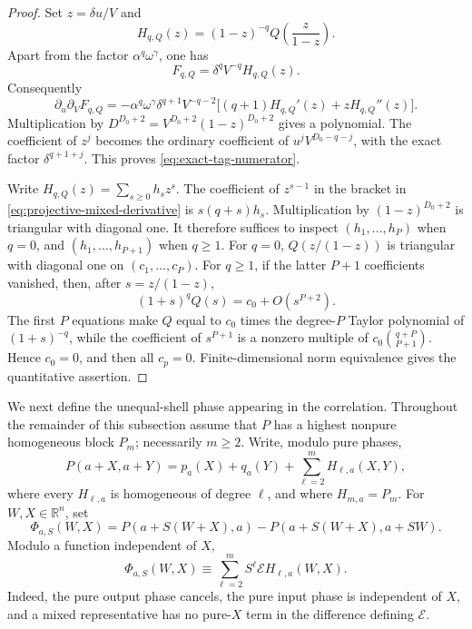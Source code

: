 \documentclass[11pt]{article}
\numberwithin{equation}{section}
\theoremstyle{remark}
\theoremstyle{definition}
\begin{document}
\begin{proof}
Set \(z=\delta u/V\) and
\[
 H_{q,Q}(z)=(1-z)^{-q}Q\left(\frac{z}{1-z}\right).
\]
Apart from the factor \(\alpha^q\omega^\gamma\), one has
\[
 F_{q,Q}=\delta^qV^{-q}H_{q,Q}(z).
\]
Consequently
\begin{equation}\label{eq:projective-mixed-derivative}
 \partial_u\partial_VF_{q,Q}
 =-\alpha^q\omega^\gamma\delta^{q+1}V^{-q-2}
 \bigl[(q+1)H_{q,Q}'(z)+zH_{q,Q}''(z)\bigr].
\end{equation}
Multiplication by
\(D^{D_0+2}=V^{D_0+2}(1-z)^{D_0+2}\) gives a polynomial.
The coefficient of \(z^j\) becomes the ordinary coefficient of
\(u^jV^{D_0-q-j}\), with the exact factor
\(\delta^{q+1+j}\).  This proves \eqref{eq:exact-tag-numerator}.

Write \(H_{q,Q}(z)=\sum_{s\ge0}h_sz^s\).  The coefficient of
\(z^{s-1}\) in the bracket in
\eqref{eq:projective-mixed-derivative} is
\(s(q+s)h_s\).  Multiplication by \((1-z)^{D_0+2}\) is triangular with
diagonal one.  It therefore suffices to inspect
\((h_1,\ldots,h_P)\) when \(q=0\), and
\((h_1,\ldots,h_{P+1})\) when \(q\ge1\).  For \(q=0\),
\(Q(z/(1-z))\) is triangular with diagonal one on
\((c_1,\ldots,c_P)\).  For \(q\ge1\), if the latter \(P+1\)
coefficients vanished, then, after \(s=z/(1-z)\),
\[
 (1+s)^qQ(s)=c_0+O(s^{P+2}).
\]
The first \(P\) equations make \(Q\) equal to \(c_0\) times the
degree-\(P\) Taylor polynomial of \((1+s)^{-q}\), while the coefficient
of \(s^{P+1}\) is a nonzero multiple of
\(c_0\binom{q+P}{P+1}\).  Hence \(c_0=0\), and then all \(c_p=0\).
Finite-dimensional norm equivalence gives the quantitative assertion.
\end{proof}

We next define the unequal-shell phase appearing in the correlation.
Throughout the remainder of this subsection assume that \(P\) has a
highest nonpure homogeneous block \(P_m\); necessarily \(m\ge2\).
Write, modulo pure phases,
\begin{equation}\label{eq:translated-homogeneous-blocks}
 P(a+X,a+Y)=p_a(X)+q_a(Y)+\sum_{\ell=2}^mH_{\ell,a}(X,Y),
\end{equation}
where every \(H_{\ell,a}\) is homogeneous of degree \(\ell\), and where
\(H_{m,a}=P_m\).  For \(W,X\in\mathbb R^n\), set
\begin{equation}\label{eq:actual-correlation-phase}
 \Phi_{a,S}(W,X)
 =P(a+S(W+X),a)-P(a+S(W+X),a+SW).
\end{equation}
Modulo a function independent of \(X\),
\begin{equation}\label{eq:actual-oriented-decomposition}
 \Phi_{a,S}(W,X)
 \equiv\sum_{\ell=2}^mS^\ell\mathcal EH_{\ell,a}(W,X).
\end{equation}
Indeed, the pure output phase cancels, the pure input phase is independent
of \(X\), and a mixed representative has no pure-\(X\) term in the
difference defining \(\mathcal E\).
\end{document}
